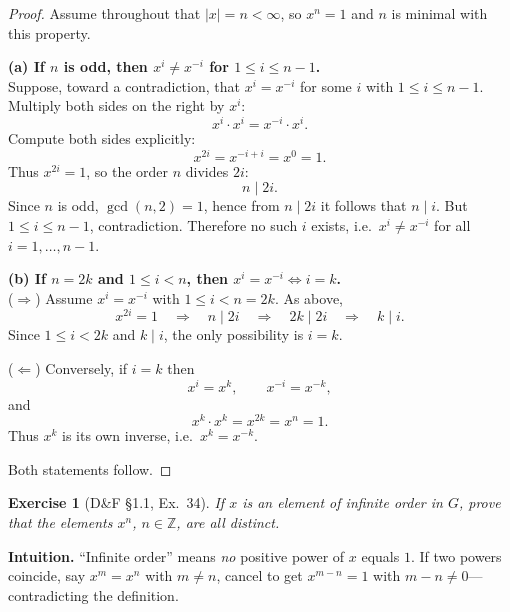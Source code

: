 \documentclass[12pt]{article}
\newtheorem{exercise}[theorem]{Exercise}
\theoremstyle{definition}
\begin{document}
\dotfill

\begin{proof}
Assume throughout that $|x|=n<\infty$, so $x^n=1$ and $n$ is minimal with this property.

\dotfill

\noindent\textbf{(a) If $n$ is odd, then $x^i\neq x^{-i}$ for $1\le i\le n-1$.}\\

\noindent
Suppose, toward a contradiction, that $x^i=x^{-i}$ for some $i$ with $1\le i\le n-1$.
Multiply both sides on the right by $x^i$:
\[
x^i\cdot x^i = x^{-i}\cdot x^i.
\]
Compute both sides explicitly:
\[
x^{2i} = x^{-i+i} = x^0 = 1.
\]
Thus $x^{2i}=1$, so the order $n$ divides $2i$:
\[
n\mid 2i.
\]
Since $n$ is odd, $\gcd(n,2)=1$, hence from $n\mid 2i$ it follows that $n\mid i$.
But $1\le i\le n-1$, contradiction. Therefore no such $i$ exists, i.e.\ $x^i\neq x^{-i}$ for all $i=1,\dots,n-1$.

\dotfill

\noindent\textbf{(b) If $n=2k$ and $1\le i<n$, then $x^i=x^{-i}\iff i=k$.}\\

\noindent
($\Rightarrow$) Assume $x^i=x^{-i}$ with $1\le i< n=2k$.
As above,
\[
x^{2i}=1 \quad\Longrightarrow\quad n\mid 2i \quad\Longrightarrow\quad 2k\mid 2i \quad\Longrightarrow\quad k\mid i.
\]
Since $1\le i<2k$ and $k\mid i$, the only possibility is $i=k$.

\noindent
($\Leftarrow$) Conversely, if $i=k$ then
\[
x^i=x^k,\qquad x^{-i}=x^{-k},
\]
and
\[
x^k\cdot x^k = x^{2k} = x^{n} = 1.
\]
Thus $x^k$ is its own inverse, i.e.\ $x^k=x^{-k}$.

\dotfill

Both statements follow.
\end{proof}

\newpage

\begin{exercise}[D\&F §1.1, Ex.~34]
If $x$ is an element of infinite order in $G$, prove that the elements $x^n$, $n\in\mathbb{Z}$, are all distinct.
\end{exercise}

\dotfill

\noindent
\textbf{Intuition.}
“Infinite order” means \emph{no} positive power of $x$ equals $1$. If two powers coincide, say $x^m=x^n$ with $m\ne n$, cancel to get $x^{m-n}=1$ with $m-n\ne 0$—contradicting the definition.
\end{document}

